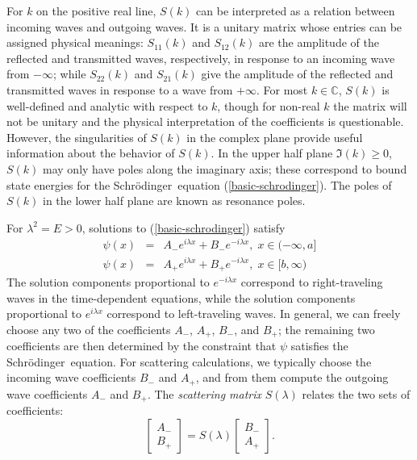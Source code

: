 \documentclass{article}
\newcommand{\schrodinger}{Schr\"{o}dinger}
\newcommand{\bbC}{\mathbb{C}}
\begin{document}
For $k$ on the positive real line, $S(k)$ can be interpreted as a
relation between incoming waves and outgoing waves.  It is a unitary
matrix whose entries can be assigned physical meanings: $S_{11}(k)$
and $S_{12}(k)$ are the amplitude of the reflected and transmitted
waves, respectively, in response to an incoming wave from $-\infty$;
while $S_{22}(k)$ and $S_{21}(k)$ give the amplitude of the reflected
and transmitted waves in response to a wave from $+\infty$.  For most
$k \in \bbC$, $S(k)$ is well-defined and analytic with respect to $k$,
though for non-real $k$ the matrix will not be unitary and the
physical interpretation of the coefficients is questionable.  However,
the singularities of $S(k)$ in the complex plane provide useful
information about the behavior of $S(k)$.  In the upper half plane
$\Im(k) \geq 0$, $S(k)$ may only have poles along the imaginary axis;
these correspond to bound state energies for the \schrodinger\
equation (\ref{basic-schrodinger}).  The poles of $S(k)$ in the lower
half plane are known as resonance poles.


For $\lambda^2 = E > 0$, solutions to (\ref{basic-schrodinger}) satisfy
\begin{eqnarray*}
  \psi(x) & = & A_{-} e^{i \lambda x} + B_{-} e^{-i \lambda x}, \;
    x \in (-\infty,a] \\
  \psi(x) & = & A_{+} e^{i \lambda x} + B_{+} e^{-i \lambda x}, \;
    x \in [b,\infty)
\end{eqnarray*}
The solution components proportional to $e^{-i \lambda x}$ correspond
to right-traveling waves in the time-dependent equations, while the
solution components proportional to $e^{i \lambda x}$ correspond to
left-traveling waves.  In general, we can freely choose any two of the
coefficients $A_{-}$, $A_{+}$, $B_{-}$, and $B_{+}$; the remaining two
coefficients are then determined by the constraint that $\psi$ satisfies
the \schrodinger\ equation.  For scattering calculations, we typically
choose the incoming wave coefficients $B_{-}$ and $A_{+}$, and from them
compute the outgoing wave coefficients $A_{-}$ and $B_{+}$.  The
\emph{scattering matrix} $S(\lambda)$ relates the two sets of coefficients:
\begin{equation}
  \begin{bmatrix} A_{-} \\ B_{+} \end{bmatrix} = 
  S(\lambda)
  \begin{bmatrix} B_{-} \\ A_{+} \end{bmatrix}.
\end{equation}
\end{document}
